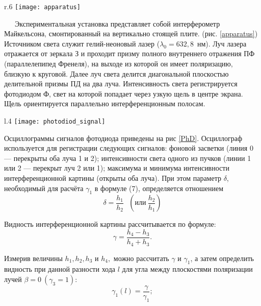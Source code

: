 \documentclass{MagicLabs}
\begin{document}
\begin{wrapfigure}[17]{r}{.6\textwidth}\centering
	\vspace{-3ex}
	\texttt{[image: apparatus]}
	\caption{Схема установки}
	\label{apparatus}
\end{wrapfigure}

\ \ \ Экспериментальная установка представляет собой интерферометр Майкельсона,
смонтированный на вертикально стоящей плите. (рис. \ref{apparatus}) Источником света служит 
гелий-неоновый лазер ($ \lambda_0 = 632,8$~нм). Луч лазера отражается от зеркала З 
и проходит призму полного внутреннего отражения ПФ (параллелепипед Френеля), 
на выходе из которой он имеет поляризацию, близкую к круговой.
Далее луч света делится диагональной плоскостью делительной призмы ПД на два луча.
Интенсивность света регистрируется фотодиодом Ф, свет на которой попадает через 
узкую щель в центре экрана. Щель ориентируется параллельно интерференционным полосам. 

\begin{wrapfigure}[10]{l}{.4\textwidth}\centering
	\vspace{-3ex}
	\texttt{[image: photodiod\_signal]}
	\caption{Осциллограмма сигналов фотодиода}
	\label{PhD}
\end{wrapfigure}

Осциллограммы сигналов фотодиода приведены на рис \ref{PhD}. Осциллограф используется для
регистрации следующих сигналов: фоновой засветки (линия 0 — перекрыты оба луча 1 и 2);
интенсивности света одного из пучков (линии 1 или 2 — перекрыт луч 2 или 1); максимума 
и минимума интенсивности интерференционной картины (открыты оба луча). 
При этом параметр $ \delta $, необходимый для расчёта $ \gamma_1 $ в формуле (7),
определяется отношением
\begin{equation}\label{delta}
	\delta = \dfrac{h_1}{h_2}~~~\left(или~\dfrac{h_2}{h_1}\right)
\end{equation}

Видность интерференционной картины рассчитывается по формуле:
\begin{equation}\label{gamma}
	\gamma = \dfrac{h_4 - h_3}{h_4 + h_3}.
\end{equation}

Измерив величины $ h_1, h_2, h_3 $ и $ h_4, $ можно рассчитать $ \gamma $ и $ \gamma_1 $, 
а затем определить видность при данной разности хода $ l $ для угла между плоскостями
поляризации лучей $ \beta = 0~(\gamma_3 = 1): $
\begin{equation}\label{gamma1}
	\gamma_1(l) = \dfrac{\gamma}{\gamma_1};
\end{equation}
\end{document}
